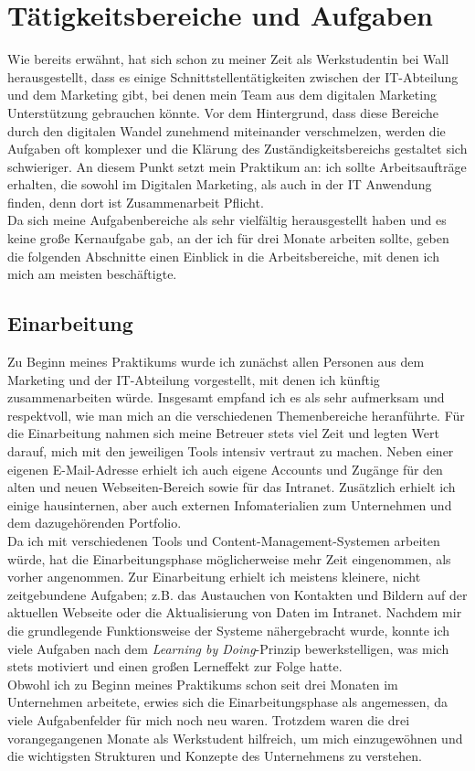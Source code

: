 \chapter{Tätigkeitsbereiche und Aufgaben}\label{chap:aufgaben}

Wie bereits erwähnt, hat sich schon zu meiner Zeit als Werkstudentin bei Wall herausgestellt, dass es einige Schnittstellentätigkeiten zwischen der IT-Abteilung und dem Marketing gibt, bei denen mein Team aus dem digitalen Marketing Unterstützung gebrauchen könnte. Vor dem Hintergrund, dass diese Bereiche durch den digitalen Wandel zunehmend miteinander verschmelzen, werden die Aufgaben oft komplexer und die Klärung des Zuständigkeitsbereichs gestaltet sich schwieriger. An diesem Punkt setzt mein Praktikum an: ich sollte Arbeitsaufträge erhalten, die sowohl im Digitalen Marketing, als auch in der IT Anwendung finden, denn dort ist Zusammenarbeit Pflicht. \\ Da sich meine Aufgabenbereiche als sehr vielfältig herausgestellt haben und es keine große Kernaufgabe gab, an der ich für drei Monate arbeiten sollte, geben die folgenden Abschnitte einen Einblick in die Arbeitsbereiche, mit denen ich mich am meisten beschäftigte. 

\section{Einarbeitung}\label{sec:einarbeitung}

Zu Beginn meines Praktikums wurde ich zunächst allen Personen aus dem Marketing und der IT-Abteilung vorgestellt, mit denen ich künftig zusammenarbeiten würde. Insgesamt empfand ich es als sehr aufmerksam und respektvoll, wie man mich an die verschiedenen Themenbereiche heranführte. Für die Einarbeitung nahmen sich meine Betreuer stets viel Zeit und legten Wert darauf, mich mit den jeweiligen Tools intensiv vertraut zu machen. Neben einer eigenen E-Mail-Adresse erhielt ich auch eigene Accounts und Zugänge für den alten und neuen Webseiten-Bereich sowie für das Intranet. Zusätzlich erhielt ich einige hausinternen, aber auch externen Infomaterialien zum Unternehmen und dem dazugehörenden Portfolio. \\ Da ich mit verschiedenen Tools und Content-Management-Systemen arbeiten würde, hat die Einarbeitungsphase möglicherweise mehr Zeit eingenommen, als vorher angenommen. Zur Einarbeitung erhielt ich meistens kleinere, nicht zeitgebundene Aufgaben; z.B. das Austauchen von Kontakten und Bildern auf der aktuellen Webseite oder die Aktualisierung von Daten im Intranet. Nachdem mir die grundlegende Funktionsweise der Systeme nähergebracht wurde, konnte ich viele Aufgaben nach dem \textit{Learning by Doing}-Prinzip bewerkstelligen, was mich stets motiviert und einen großen Lerneffekt zur Folge hatte. \\ Obwohl ich zu Beginn meines Praktikums schon seit drei Monaten im Unternehmen arbeitete, erwies sich die Einarbeitungsphase als angemessen, da viele Aufgabenfelder für mich noch neu waren. Trotzdem waren die drei vorangegangenen Monate als Werkstudent hilfreich, um mich einzugewöhnen und die wichtigsten Strukturen und Konzepte des Unternehmens zu verstehen. 

